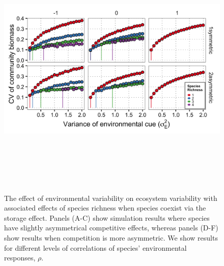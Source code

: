 \documentclass[12pt,]{article}
\begin{document}
\begin{figure}[!ht]
  \centering
      \includegraphics[height=5in]{./components/storage_effect_div+envar_varycomp.png}
  \caption{The effect of environmental variability on ecosystem variability with associated effects of species richness when species coexist via the storage effect. Panels (A-C) show simulation results where species have slightly asymmetrical competitive effects, whereas panels (D-F) show results when competition is more asymmetric. We show results for different levels of correlations of species' environmental responses, $\rho$.}
\end{figure}

\newpage{}
\end{document}
